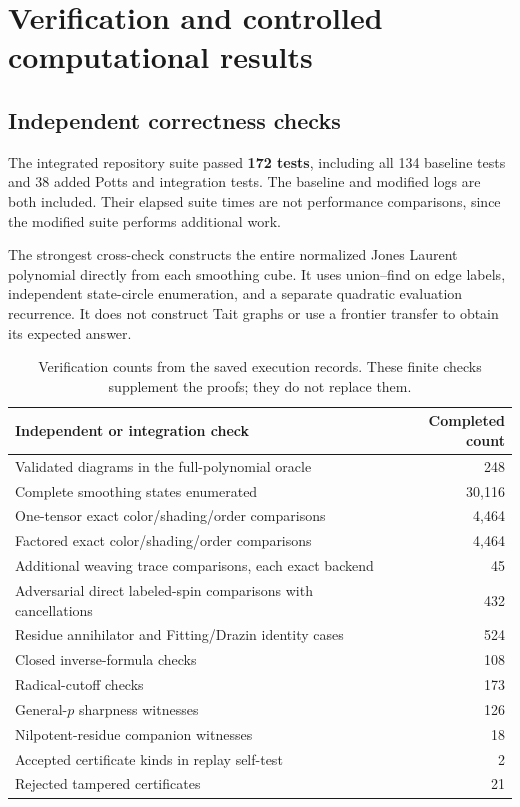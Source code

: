 \section{Verification and controlled computational results}
\label{sec:experiments}

\subsection{Independent correctness checks}

The integrated repository suite passed \textbf{172 tests}, including all
134 baseline tests and 38 added Potts and integration tests.
The baseline and modified logs are both included. Their elapsed suite times
are not performance comparisons, since the modified suite performs additional
work.

The strongest cross-check constructs the entire normalized Jones Laurent
polynomial directly from each smoothing cube. It uses union--find on edge
labels, independent state-circle enumeration, and a separate quadratic
evaluation recurrence. It does not construct Tait graphs or use a frontier
transfer to obtain its expected answer.

\begin{table}[htbp]
\centering\small
\begin{tabularx}{\textwidth}{@{}Xr@{}}
\toprule
Independent or integration check & Completed count\\
\midrule
Validated diagrams in the full-polynomial oracle & 248\\
Complete smoothing states enumerated & 30,116\\
One-tensor exact color/shading/order comparisons & 4,464\\
Factored exact color/shading/order comparisons & 4,464\\
Additional weaving trace comparisons, each exact backend & 45\\
Adversarial direct labeled-spin comparisons with cancellations & 432\\
Residue annihilator and Fitting/Drazin identity cases & 524\\
Closed inverse-formula checks & 108\\
Radical-cutoff checks & 173\\
General-$p$ sharpness witnesses & 126\\
Nilpotent-residue companion witnesses & 18\\
Accepted certificate kinds in replay self-test & 2\\
Rejected tampered certificates & 21\\
\bottomrule
\end{tabularx}
\caption{Verification counts from the saved execution records. These finite
checks supplement the proofs; they do not replace them.}
\label{tab:checks}
\end{table}

